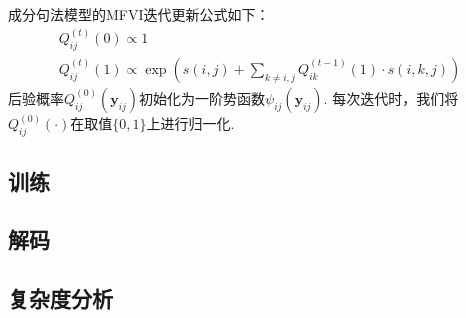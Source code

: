 成分句法模型的MFVI迭代更新公式如下\cite{wang-etal-2019-second}：
\begin{equation}
    \label{eq:mfvi-con}
    \begin{array}{l}
        Q_{ij}^{(t)}(0)\propto 1 \\
        Q_{ij}^{(t)}(1)\propto \exp\left(s(i,j) +\sum_{k\neq i,j} Q_{ik}^{(t-1)}(1)\cdot s(i,k,j) \right)
    \end{array}
\end{equation}
后验概率$Q_{ij}^{(0)}(\boldsymbol{y}_{ij})$初始化为一阶势函数$\psi_{ij}(\boldsymbol{y}_{ij})$.
每次迭代时，我们将$Q_{ij}^{(0)}(\cdot)$在取值$\{0,1\}$上进行归一化.


\subsection{训练}

\subsection{解码}

\subsection{复杂度分析}


